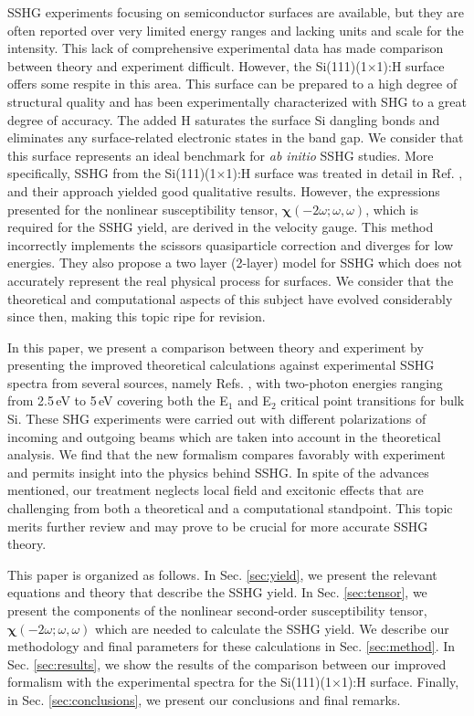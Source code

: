 \documentclass[prb,superscriptaddress,showpacs,twocolumn,letterpaper]{revtex4}
\begin{document}
SSHG experiments focusing on semiconductor surfaces are available, but they are
often reported over very limited energy ranges and lacking units and scale for
the intensity. This lack of comprehensive experimental data has made comparison
between theory and experiment difficult. However, the Si(111)(1$\times$1):H
surface offers some respite in this area. This surface can be prepared to a high
degree of structural quality and has been experimentally characterized with SHG
to a great degree of accuracy.\cite{mitchellSS01, mejiaPRB02} The added H
saturates the surface Si dangling bonds and eliminates any surface-related
electronic states in the band gap. We consider that this surface represents an
ideal benchmark for \emph{ab initio} SSHG studies. More specifically, SSHG from
the Si(111)(1$\times$1):H surface was treated in detail in Ref.
, and their approach yielded good qualitative results.
However, the expressions presented for the nonlinear susceptibility tensor,
$\boldsymbol{\chi}(-2\omega;\omega,\omega)$, which is required for the SSHG
yield, are derived in the velocity gauge. This method incorrectly implements the
scissors quasiparticle correction and diverges for low
energies.\cite{cabellosPRB09} They also propose a two layer (2-layer) model for
SSHG which does not accurately represent the real physical process for surfaces.
We consider that the theoretical and computational aspects of this subject have
evolved considerably since then, making this topic ripe for revision.

In this paper, we present a comparison between theory and experiment by
presenting the improved theoretical calculations against experimental SSHG
spectra from several sources, namely Refs. , with two-photon energies ranging from
2.5\,eV to 5\,eV covering both the E$_{1}$ and E$_{2}$ critical point
transitions for bulk Si. These SHG experiments were carried out with different
polarizations of incoming and outgoing beams which are taken into account in the
theoretical analysis. We find that the new formalism compares favorably with
experiment and permits insight into the physics behind SSHG. In spite of the
advances mentioned, our treatment neglects local field and excitonic effects
that are challenging from both a theoretical and a computational standpoint.
This topic merits further review and may prove to be crucial for more accurate
SSHG theory.

This paper is organized as follows. In Sec. \ref{sec:yield}, we present the
relevant equations and theory that describe the SSHG yield. In Sec.
\ref{sec:tensor}, we present the components of the nonlinear second-order
susceptibility tensor, $\boldsymbol{\chi}(-2\omega;\omega,\omega)$ which are
needed to calculate the SSHG yield. We describe our methodology and final
parameters for these calculations in Sec. \ref{sec:method}. In Sec.
\ref{sec:results}, we show the results of the comparison between our improved
formalism with the experimental spectra for the Si(111)(1$\times$1):H surface.
Finally, in Sec. \ref{sec:conclusions}, we present our conclusions and final
remarks.
\end{document}
